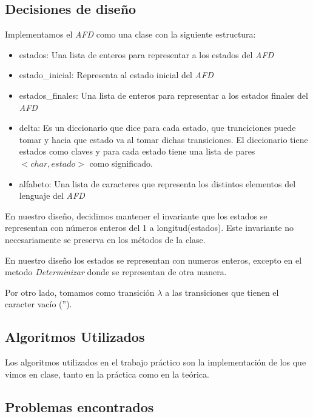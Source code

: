 \subsection{Decisiones de diseño}
Implementamos el \emph{AFD} como una clase con la siguiente estructura:

\begin{itemize}
	\item estados: Una lista de enteros para representar a los estados del \emph{AFD}
	\item estado\_inicial: Representa al estado inicial del \emph{AFD}
	\item estados\_finales: Una lista de enteros para representar a los estados finales del \emph{AFD}
	\item delta: Es un diccionario que dice para cada estado, que tranciciones puede tomar y hacia que estado va al tomar dichas transiciones. El diccionario tiene estados como claves y para cada estado tiene una lista de pares $<char, estado>$ como significado.
	\item alfabeto: Una lista de caracteres que representa los distintos elementos del lenguaje del \emph{AFD}
\end{itemize}

En nuestro diseño, decidimos mantener el invariante que los estados se representan con números enteros del 1 a longitud(estados). Este invariante no necesariamente se preserva en los métodos de la clase.

En nuestro diseño los estados se representan con numeros enteros, excepto en el metodo \emph{Determinizar} donde se representan de otra manera. %

Por otro lado, tomamos como transición $\lambda$ a las transiciones que tienen el caracter vacío ('').

\subsection{Algoritmos Utilizados}

Los algoritmos utilizados en el trabajo práctico son la implementación de los que vimos en clase, tanto en la práctica como en la teórica.

\subsection{Problemas encontrados}
